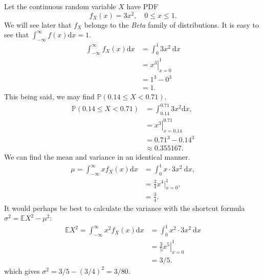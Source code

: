 \documentclass[captions=tableheading]{scrbook}
\begin{document}
\begin{example}

Let the continuous random variable \(X\) have PDF
\[
f_{X}(x)=3x^{2},\quad0\leq x\leq 1.
\]
We will see later that \(f_{X}\) belongs to the \emph{Beta} family of distributions. It is easy to see that \(\int_{-\infty}^{\infty}f(x)\mathrm{d} x=1\).
\begin{align*}
\int_{-\infty}^{\infty}f_{X}(x)\mathrm{d} x & =\int_{0}^{1}3x^{2}\:\mathrm{d} x\\
 & =\left.x^{3}\right|_{x=0}^{1}\\
 & =1^{3}-0^{3}\\
 & =1.
\end{align*}
This being said, we may find \(\mathbb{P}(0.14\leq X<0.71)\).
\begin{align*}
\mathbb{P}(0.14\leq X<0.71) & =\int_{0.14}^{0.71}3x^{2}\mathrm{d} x,\\
 & =\left.x^{3}\right|_{x=0.14}^{0.71}\\
 & =0.71^{3}-0.14^{3}\\
 & \approx0.355167.
\end{align*}
We can find the mean and variance in an identical manner.
\begin{align*}
\mu=\int_{-\infty}^{\infty}xf_{X}(x)\mathrm{d} x & =\int_{0}^{1}x\cdot3x^{2}\:\mathrm{d} x,\\
 & =\frac{3}{4}x^{4}|_{x=0}^{1},\\
 & =\frac{3}{4}.
\end{align*}
It would perhaps be best to calculate the variance with the shortcut formula \(\sigma^{2}=\mathbb{E} X^{2}-\mu^{2}\):
\begin{align*}
\mathbb{E} X^{2}=\int_{-\infty}^{\infty}x^{2}f_{X}(x)\mathrm{d} x & =\int_{0}^{1}x^{2}\cdot3x^{2}\:\mathrm{d} x\\
 & =\left.\frac{3}{5}x^{5}\right|_{x=0}^{1}\\
 & =3/5.
\end{align*}
which gives \(\sigma^{2}=3/5-(3/4)^{2}=3/80\).
\end{example}
\end{document}
